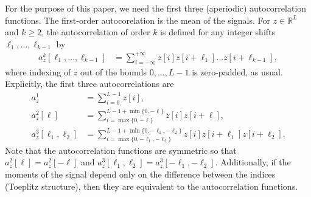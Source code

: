 \documentclass[english,11pt]{article}
\newcommand{\TODO}[1]{{\color{red}{[#1]}}}
\numberwithin{equation}{section}
\theoremstyle{plain}
\theoremstyle{definition}
\theoremstyle{remark}
\theoremstyle{plain}
\theoremstyle{remark}
\theoremstyle{plain}
\theoremstyle{plain}
\newcommand{\RL}{\mathbb{R}^L}
\begin{document}
For the purpose of this paper, we need the first three (aperiodic) autocorrelation functions. The first-order autocorelation is the mean of the signals. For  
$z\in\RL$ and $k\geq 2$, the autocorrelation of order $k$ is defined for any integer shifts $\ell_1, \ldots, \ell_{k-1}$ by
\begin{align}
	a_z^k[\ell_1,\ldots,\ell_{k-1}]  & = \sum_{i=-\infty}^{+\infty} z[i]z[i+\ell_1]\ldots z[i+\ell_{k-1}],
	\label{eq:ac_general}
\end{align}
where indexing of $z$ out of the bounds $0, \ldots, L-1$ is zero-padded, as usual.
Explicitly, the first three autocorrelations are
\begin{align} 
	a_z^1 & = \sum_{i=0}^{L-1} z[i], \nonumber\\
	a_z^2[\ell] & = \sum_{i = \max\{0, -\ell\}}^{L-1 + \min\{0, -\ell\}} z[i]z[i+\ell], \nonumber\\
	a_z^3[\ell_1,\ell_2] & = \sum_{i = \max\{0, -\ell_1, -\ell_2\}}^{L-1 + \min\{0, -\ell_1, -\ell_2\}} z[i]z[i+\ell_1]z[i+\ell_2]. \label{eq:ac_special}
\end{align}
Note that the autocorrelation functions are symmetric so that $a_z^2[\ell] = a_z^2[-\ell]$ and $a_z^3[\ell_1,\ell_2] = a_z^3[-\ell_1,-\ell_2]$. \TODO{We also have $a_z^3[\ell_1,\ell_2] = a_z^3[\ell_2,\ell_1]$ -- is that intended? Do we really have symmetry with the negative signs? I think we have $(\ell_1, \ell_2) \sim (-\ell_1, \ell_2-\ell_1)$; to be checked, but I don't think this is correct;}
Additionally, if the moments of the signal depend only on the difference between the indices (Toeplitz structure), then they are equivalent to the autocorrelation functions.
\end{document}
